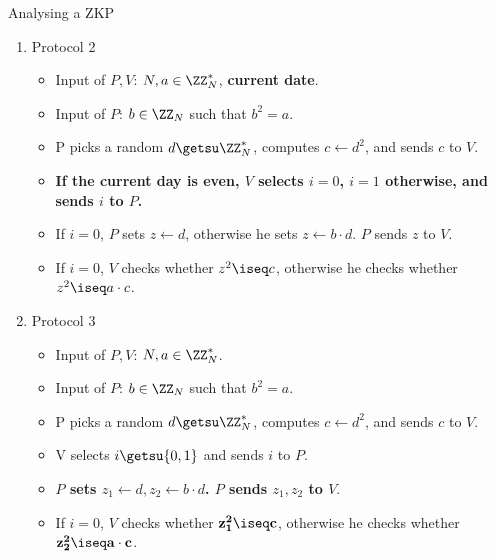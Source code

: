 \documentclass{practice}
\begin{document}
\begin{task}{Analysing a ZKP}
\begin{enumerate}
    \item Protocol 2
    \begin{itemize}
      \item Input of $P, V$: $N, a\in\ZZ^*_N$, \textbf{current date}.
      \item Input of $P$: $b\in\ZZ_N$ such that $b^2 = a$.
      \item P picks a random $d \getsu \ZZ^*_N$, computes $c \gets d^2$, and sends $c$ to $V$.
      \item \textbf{If the current day is even, $V$ selects $i = 0$, $i = 1$ otherwise, and sends $i$ to $P$.} 
      \item If $i=0$, $P$ sets $z \gets d$, otherwise he sets $z \gets b \cdot d$. $P$ sends $z$ to $V$.
      \item If $i=0$, $V$ checks whether $z^2 \iseq c$, otherwise he checks whether $z^2 \iseq a \cdot c$.
    \end{itemize}

    \newpage

    \item Protocol 3
    \begin{itemize}
      \item Input of $P, V$: $N, a\in\ZZ^*_N$.
      \item Input of $P$: $b\in\ZZ_N$ such that $b^2 = a$.
      \item P picks a random $d \getsu \ZZ^*_N$, computes $c \gets d^2$, and sends $c$ to $V$.
      \item V selects $i \getsu \{0,1\}$ and sends $i$ to $P$.
      \item \textbf{$P$ sets $z_1 \gets d, z_2 \gets b \cdot d$. $P$ sends $z_1, z_2$ to $V$}.
      \item If $i=0$, $V$ checks whether $\mathbf{z_1^2 \iseq c}$, otherwise he checks whether $\mathbf{z_2^2 \iseq a \cdot c}$.
    \end{itemize}
  \end{enumerate}
\end{task}
\end{document}

